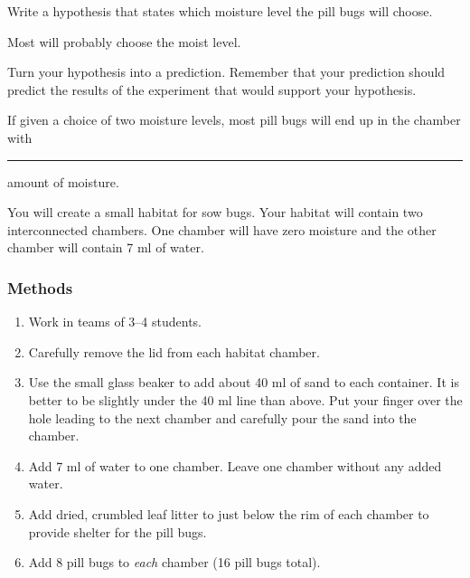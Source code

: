 \documentclass[12pt, hidelinks]{exam}
\newcommand*\AnswerBox[2]{%
    \parbox[t][#1]{0.92\textwidth}{%
    \begin{solution}#2\end{solution}}
    \vspace{\stretch{1}}
}
\newlength{\basespace}
\begin{document}
\begin{questions}

\question \label{ques:hypothesis}
Write a hypothesis that states which moisture level the pill bugs will choose. %

\AnswerBox{0.35\basespace}{Most will probably choose the moist level.}


\question
Turn your hypothesis into a prediction. Remember that your prediction should predict the results of the experiment that would support your hypothesis. 

\AnswerBox{0.35\basespace}{%
	If given a choice of two moisture levels, most pill bugs will end up in the chamber with \rule{0.75in}{0.4pt} amount of moisture.
}

You will create a small habitat for sow bugs.  Your habitat will contain two interconnected chambers.  One chamber will have zero moisture and the other chamber will contain 7 ml of water.


\subsubsection*{Methods}

\begin{enumerate}
	
	\item Work in teams of 3–4 students.
	
	\item Carefully remove the lid from each habitat chamber. 
	
	\item Use the small glass beaker to add about 40 ml of sand to each container. It is better to be slightly under the 40 ml line than above. Put your finger over the hole leading to the next chamber and carefully pour the sand into the chamber.
	
	\item Add 7 ml of water to one chamber. Leave one chamber without any added water. %
	
	\item Add dried, crumbled leaf litter to just below the rim of each chamber to provide shelter for the pill bugs.
	
	\item Add 8 pill bugs to \emph{each} chamber (16 pill bugs total). %
	

\end{enumerate}
\end{questions}
\end{document}
